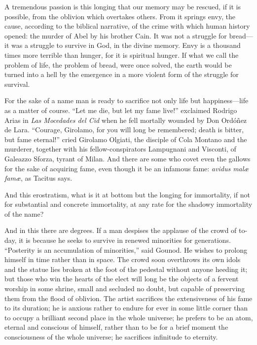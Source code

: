 A tremendous passion is this longing that our memory may be rescued,
if it is possible, from the oblivion which overtakes others. From it
springs envy, the cause, according to the biblical narrative, of the
crime with which human history opened: the murder of Abel by his
brother Cain. It was not a struggle for bread---it was a struggle to
survive in God, in the divine memory. Envy is a thousand times more
terrible than hunger, for it is spiritual hunger. If what we call the
problem of life, the problem of bread, were once solved, the earth
would be turned into a hell by the emergence in a more violent form of
the struggle for survival.

For the sake of a name man is ready to sacrifice not only life but
hap\-pi\-ness---life as a matter of course. ``Let me die, but let my
fame live!'' exclaimed Rodrigo Arias in \textit{Las Mocedades del Cid}
when he fell mortally wounded  by Don Ord\'o\~nez de Lara.
``Courage, Girolamo, for you will long be remembered; death is bitter,
but fame eternal!'' cried Girolamo Olgiati, the disciple of Cola
Montano and the murderer, together with his fellow-conspirators
Lampugnani and Visconti, of Galeazzo Sforza, tyrant of Milan. And
there are some who covet even the gallows for the sake of acquiring
fame, even though it be an infamous fame: \textit{avidus mal{\ae}
fam\ae}, as Tacitus says.

And this erostratism, what is it at bottom but the longing for
immortality, if not for substantial and concrete immortality, at any
rate for the shadowy immortality of the name?

And in this there are degrees. If a man despises the applause of the
crowd of to-day, it is because he seeks to survive in renewed
minorities for generations. ``Posterity is an accumulation of
minorities,'' said Gounod. He wishes to prolong himself in time rather
than in space. The crowd soon overthrows its own idols and the statue
lies broken at the foot of the pedestal without anyone heeding it; but
those who win the hearts of the elect will long be the objects of a
fervent worship in some shrine, small and secluded no doubt, but
capable of preserving them from the flood of oblivion. The artist
sacrifices the extensiveness of his fame to its duration; he is
anxious rather to endure for ever in some little corner than to occupy
a brilliant second place in the whole universe; he prefers to be an
atom, eternal and conscious of himself, rather than to be for a brief
moment the consciousness of the whole universe; he sacrifices
infinitude to eternity.

